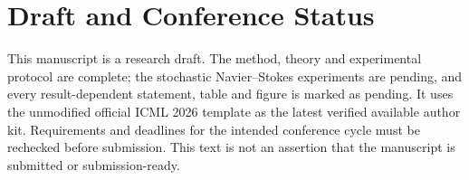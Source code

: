 \section{Draft and Conference Status}
This manuscript is a research draft. The method, theory and experimental protocol are complete; the stochastic Navier--Stokes experiments are pending, and every result-dependent statement, table and figure is marked as pending. It uses the unmodified official ICML 2026 template as the latest verified available author kit. Requirements and deadlines for the intended conference cycle must be rechecked before submission. This text is not an assertion that the manuscript is submitted or submission-ready.
